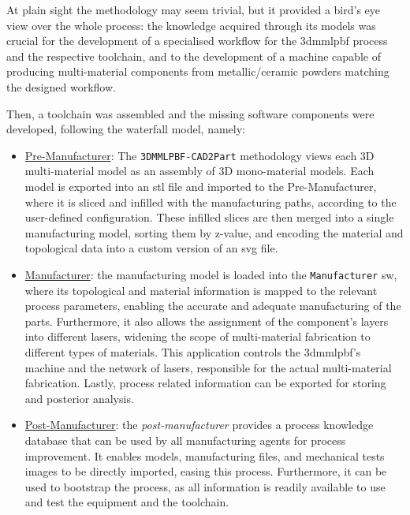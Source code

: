 At plain sight the methodology may seem trivial, but it provided a bird's eye
view over the whole process: the knowledge acquired
through its models was crucial for the development of a specialised
workflow for the \gls{3dmmlpbf} process and the respective toolchain, and to the
development of a machine capable of producing multi-material components from
metallic/ceramic powders matching the designed workflow.

Then, a toolchain was assembled and the missing software components were
developed, following the waterfall model, namely:
\begin{itemize}
\item \underline{Pre-Manufacturer}: The \texttt{3DMMLPBF-CAD2Part} methodology
  views each 3D multi-material model as an assembly of 3D mono-material models.
  Each model is exported into an \gls{stl}
  file and imported to the Pre-Manufacturer, where it is sliced and infilled
  with the manufacturing paths, according to the user-defined
  configuration. These infilled slices are then merged into a single
  manufacturing model, sorting them by z-value, and encoding the material and
  topological data into a custom version of an \gls{svg} file.
\item \underline{Manufacturer}: the manufacturing model is loaded into the
  \texttt{Manufacturer} \gls{sw}, where its topological and material information
  is mapped to the relevant process parameters, enabling the accurate
  and adequate manufacturing of the parts. Furthermore, it also allows the
  assignment of the component's layers into different lasers, widening the
  scope of multi-material fabrication to different types of materials.
  This application controls the
  \gls{3dmmlpbf}'s machine and the network of lasers, responsible for the actual
  multi-material fabrication. Lastly, process related information can be
  exported for storing and posterior analysis.
\item \underline{Post-Manufacturer}: the \emph{post-manufacturer} provides a
  process knowledge database that can be used by all manufacturing agents for
  process improvement. It enables models, manufacturing files, and mechanical
  tests images to be directly imported, easing this process.
  Furthermore, it can be used to bootstrap the
  process, as all information is readily available to use and test the equipment and the toolchain.
\end{itemize}

